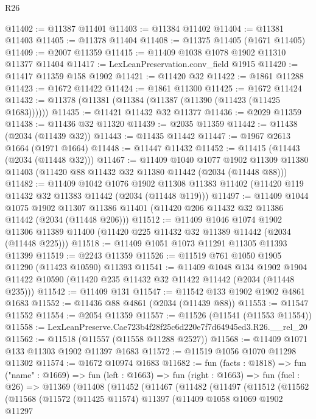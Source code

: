 \begin{lexlean}{R26}
\begin{coremodule}
@11402 := @11387 @11401
@11403 := @11384 @11402
@11404 := @11381 @11403
@11405 := @11378 @11404
@11408 := @11375 @11405 (@1671 @11405)
@11409 := @2007 @11359
@11415 := @11409 @1038 @1078 @1902 @11310 @11377 @11404
@11417 := LexLeanPreservation.conv_field @1915
@11420 := @11417 @11359 @158 @1902
@11421 := @11420 @32
@11422 := @1861 @11288
@11423 := @1672 @11422
@11424 := @1861 @11300
@11425 := @1672 @11424
@11432 := @11378 (@11381 (@11384 (@11387 (@11390 (@11423 (@11425 @1683))))))
@11435 := @11421 @11432 @32 @11377
@11436 := @2029 @11359
@11438 := @11436 @32 @11320
@11439 := @2035 @11359
@11442 := @11438 (@2034 (@11439 @32))
@11443 := @11435 @11442
@11447 := @1967 @2613 @1664 (@1971 @1664)
@11448 := @11447 @11432
@11452 := @11415 (@11443 (@2034 (@11448 @32)))
@11467 := @11409
    @1040
    @1077
    @1902
    @11309
    @11380
    @11403
    (@11420 @88 @11432 @32 @11380 @11442 (@2034 (@11448 @88)))
@11482 := @11409
    @1042
    @1076
    @1902
    @11308
    @11383
    @11402
    (@11420 @119 @11432 @32 @11383 @11442 (@2034 (@11448 @119)))
@11497 := @11409
    @1044
    @1075
    @1902
    @11307
    @11386
    @11401
    (@11420 @206 @11432 @32 @11386 @11442 (@2034 (@11448 @206)))
@11512 := @11409
    @1046
    @1074
    @1902
    @11306
    @11389
    @11400
    (@11420 @225 @11432 @32 @11389 @11442 (@2034 (@11448 @225)))
@11518 := @11409 @1051 @1073 @11291 @11305 @11393 @11399
@11519 := @2243 @11359
@11526 := @11519 @761 @1050 @1905 @11290 (@11423 @10590) @11393
@11541 := @11409
    @1048
    @134
    @1902
    @1904
    @11422
    @10590
    (@11420 @235 @11432 @32 @11422 @11442 (@2034 (@11448 @235)))
@11542 := @11409 @131
@11547 := @11542 @133 @1902 @1902 @4861 @1683
@11552 := @11436 @88 @4861 (@2034 (@11439 @88))
@11553 := @11547 @11552
@11554 := @2054 @11359
@11557 := @11526 (@11541 (@11553 @11554))
@11558 := LexLeanPreserve.Cae723b4f28f25c6d220e7f7d64945ed3.R26.__rel_20
@11562 := @11518 (@11557 (@11558 @11288 @2527))
@11568 := @11409 @1071 @133 @11303 @1902 @11397 @1683
@11572 := @11519 @1056 @1070 @11298 @11302
@11574 := @1672 @10974 @1683
@11682 := fun (facts : @1818) =>
  fun ("name" : @1669) =>
  fun (left : @1663) =>
  fun (right : @1663) =>
  fun (fuel : @26) =>
  @11369
    (@11408
      (@11452
        (@11467
          (@11482
            (@11497
              (@11512
                (@11562
                  (@11568
                    (@11572
                      (@11425 @11574)
                      @11397
                      (@11409
                        @1058
                        @1069
                        @1902
                        @11297

\end{coremodule}
\end{lexlean}
